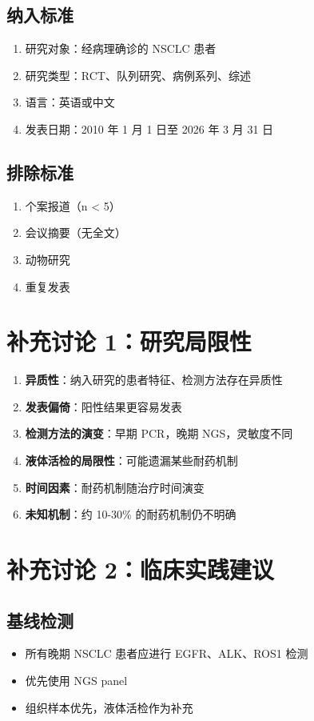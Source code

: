 \documentclass[12pt,a4paper]{article}
\begin{document}
\subsection*{纳入标准}
\begin{enumerate}
    \item 研究对象：经病理确诊的 NSCLC 患者
    \item 研究类型：RCT、队列研究、病例系列、综述
    \item 语言：英语或中文
    \item 发表日期：2010 年 1 月 1 日至 2026 年 3 月 31 日
\end{enumerate}

\subsection*{排除标准}
\begin{enumerate}
    \item 个案报道（n < 5）
    \item 会议摘要（无全文）
    \item 动物研究
    \item 重复发表
\end{enumerate}

\newpage

\section{补充讨论 1：研究局限性}

\begin{enumerate}
    \item \textbf{异质性}：纳入研究的患者特征、检测方法存在异质性
    \item \textbf{发表偏倚}：阳性结果更容易发表
    \item \textbf{检测方法的演变}：早期 PCR，晚期 NGS，灵敏度不同
    \item \textbf{液体活检的局限性}：可能遗漏某些耐药机制
    \item \textbf{时间因素}：耐药机制随治疗时间演变
    \item \textbf{未知机制}：约 10-30\% 的耐药机制仍不明确
\end{enumerate}

\newpage

\section{补充讨论 2：临床实践建议}

\subsection*{基线检测}
\begin{itemize}
    \item 所有晚期 NSCLC 患者应进行 EGFR、ALK、ROS1 检测
    \item 优先使用 NGS panel
    \item 组织样本优先，液体活检作为补充
\end{itemize}
\end{document}

